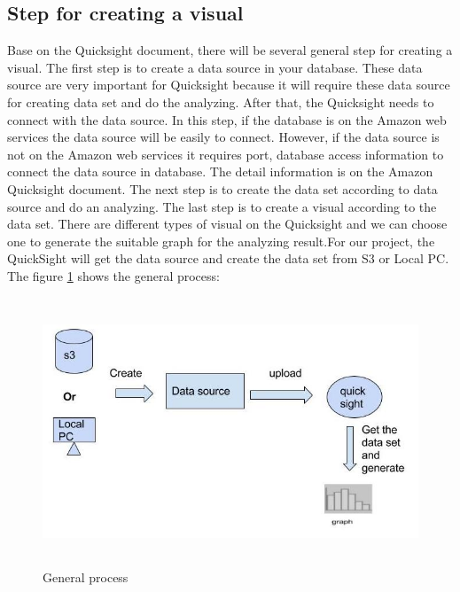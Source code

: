     \subsection{Step for creating a visual}
    Base on the Quicksight document, there will be several general step for creating a visual. The first step is to create a data source in your database. These data source are very important for Quicksight because it will require these data source for creating data set and do the analyzing. After that, the Quicksight needs to connect with the data source. In this step, if the database is on the Amazon web services the data source will be easily to connect. However, if the data source is not on the Amazon web services it requires port, database access information to connect the data source in database. The detail information is on the Amazon Quicksight document. The next step is to create the data set according to data source and do an analyzing. The last step is to create a visual according to the data set. There are different types of visual on the Quicksight and we can choose one to generate the suitable graph for the analyzing result.\cite{w4}For our project, the QuickSight will get the data source and create the data set from S3 or Local PC.\\
    The figure \ref{fig:2} shows the general process:
    \begin{figure}[H]
    \includegraphics[width=16cm, height=8cm]{6.jpg}
    \centering
    \caption{\label{fig:2}General process}
    \end{figure}

